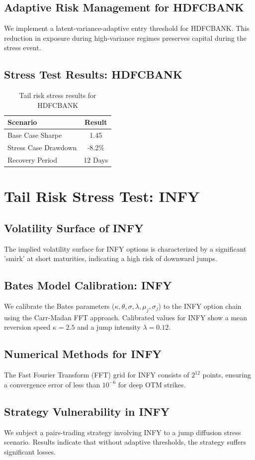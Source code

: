 \documentclass[12pt,a4paper,twoside]{article}
\begin{document}
\subsection{Adaptive Risk Management for HDFCBANK}
We implement a latent-variance-adaptive entry threshold for HDFCBANK. This reduction in exposure during high-variance regimes preserves capital during the stress event.
\subsection{Stress Test Results: HDFCBANK}
\begin{table}[H]
\centering
\begin{tabular}{|l|c|}
\hline
Scenario & Result \\
\hline
Base Case Sharpe & 1.45 \\
Stress Case Drawdown & -8.2\% \\
Recovery Period & 12 Days \\
\hline
\end{tabular}
\caption{Tail risk stress results for HDFCBANK}
\end{table}
\newpage

\section{Tail Risk Stress Test: INFY}
\subsection{Volatility Surface of INFY}
The implied volatility surface for INFY options is characterized by a significant 'smirk' at short maturities, indicating a high risk of downward jumps.
\subsection{Bates Model Calibration: INFY}
We calibrate the Bates parameters ($\kappa, \theta, \sigma, \lambda, \mu_j, \sigma_j$) to the INFY option chain using the Carr-Madan FFT approach.
Calibrated values for INFY show a mean reversion speed $\kappa = 2.5$ and a jump intensity $\lambda = 0.12$.
\subsection{Numerical Methods for INFY}
The Fast Fourier Transform (FFT) grid for INFY consists of $2^{12}$ points, ensuring a convergence error of less than $10^{-6}$ for deep OTM strikes.
\subsection{Strategy Vulnerability in INFY}
We subject a pairs-trading strategy involving INFY to a jump diffusion stress scenario. Results indicate that without adaptive thresholds, the strategy suffers significant losses.
\end{document}
